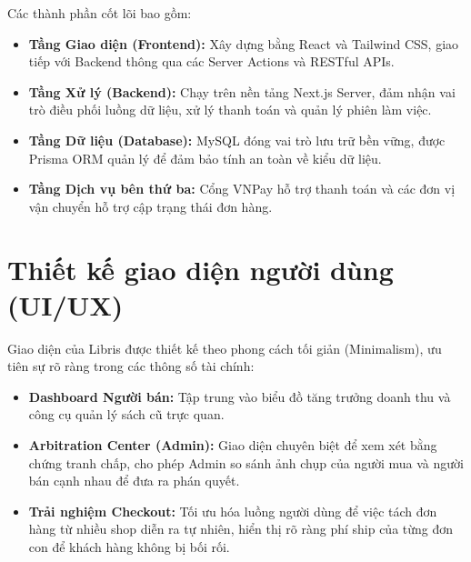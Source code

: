 \documentclass[../main.tex]{subfiles}
\begin{document}
Các thành phần cốt lõi bao gồm:
\begin{itemize}
    \item \textbf{Tầng Giao diện (Frontend):} Xây dựng bằng React và Tailwind CSS, giao tiếp với Backend thông qua các Server Actions và RESTful APIs.
    \item \textbf{Tầng Xử lý (Backend):} Chạy trên nền tảng Next.js Server, đảm nhận vai trò điều phối luồng dữ liệu, xử lý thanh toán và quản lý phiên làm việc.
    \item \textbf{Tầng Dữ liệu (Database):} MySQL đóng vai trò lưu trữ bền vững, được Prisma ORM quản lý để đảm bảo tính an toàn về kiểu dữ liệu.
    \item \textbf{Tầng Dịch vụ bên thứ ba:} Cổng VNPay hỗ trợ thanh toán và các đơn vị vận chuyển hỗ trợ cập trạng thái đơn hàng.
\end{itemize}

\section{Thiết kế giao diện người dùng (UI/UX)}
Giao diện của Libris được thiết kế theo phong cách tối giản (Minimalism), ưu tiên sự rõ ràng trong các thông số tài chính:
\begin{itemize}
    \item \textbf{Dashboard Người bán:} Tập trung vào biểu đồ tăng trưởng doanh thu và công cụ quản lý sách cũ trực quan.
    \item \textbf{Arbitration Center (Admin):} Giao diện chuyên biệt để xem xét bằng chứng tranh chấp, cho phép Admin so sánh ảnh chụp của người mua và người bán cạnh nhau để đưa ra phán quyết.
    \item \textbf{Trải nghiệm Checkout:} Tối ưu hóa luồng người dùng để việc tách đơn hàng từ nhiều shop diễn ra tự nhiên, hiển thị rõ ràng phí ship của từng đơn con để khách hàng không bị bối rối.
\end{itemize}
\end{document}
